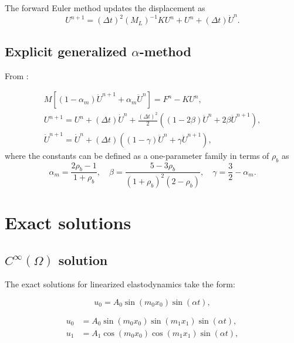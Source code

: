 \documentclass[12pt]{article}
\newcommand{\inverse}[1]{\ensuremath{{#1}^{-1}}} %
\begin{document}
The forward Euler method updates the displacement as
\begin{equation}
\label{eq:ForwardEuler}
U^{n+1} = (\Delta t)^2 \inverse{(M_L)}K U^n + U^n + (\Delta t)\dot{U}^n.
\end{equation}

\subsection{Explicit generalized $\alpha$-method}

From \cite{Hulbert1996}:

\begin{eqnarray}
M[(1-\alpha_m)\ddot{U}^{n+1} + \alpha_m \ddot{U}^n]
= F^n - KU^n, 
%
\\
%
U^{n+1} = U^n + (\Delta t)\dot{U}^n + \frac{(\Delta t)^2}{2} 
\left( (1-2\beta)\ddot{U}^n + 2\beta \ddot{U}^{n+1}\right),
%
\\
%
\dot{U}^{n+1} = \dot{U}^n + (\Delta t)((1-\gamma)\ddot{U}^n + \gamma \ddot{U}^{n+1}),
\end{eqnarray}
%
where the constants can be defined as a one-parameter family in terms
of $\rho_b$ as
\begin{equation}
\alpha_m = \frac{2\rho_b-1}{1+\rho_b},
\quad
\beta = \frac{5-3\rho_b}{(1+\rho_b)^2(2-\rho_b)},
\quad
\gamma = \frac{3}{2}-\alpha_m.
\end{equation}

\section{Exact solutions}


\subsection{$C^\infty(\Omega)$ solution}

The exact solutions for linearized elastodynamics take the form:

\begin{equation}
u_0 = A_0 \sin (m_0 x_0) \sin (\alpha t),
\end{equation}

\begin{subequations}
\begin{align}
u_0 &= A_0 \sin (m_0 x_0) \sin (m_1 x_1) \sin (\alpha t), \\
u_1 &= A_1 \cos (m_0 x_0) \cos (m_1 x_1) \sin (\alpha t), 
\end{align}
\end{subequations}
\end{document}
